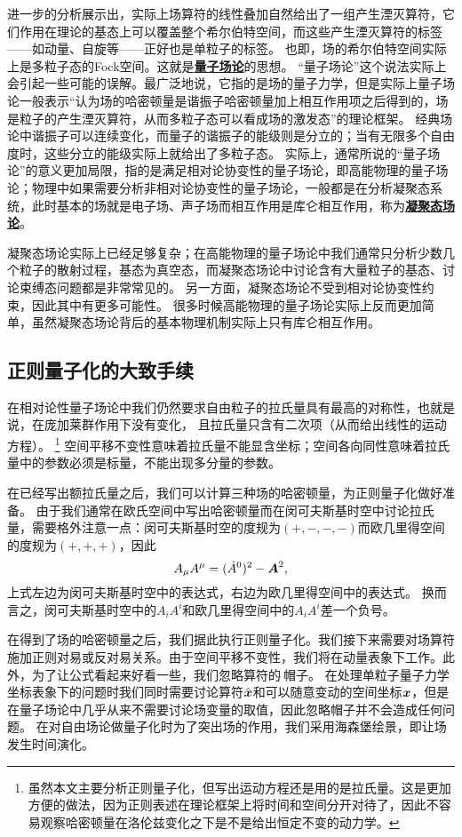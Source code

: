 \documentclass[hyperref, UTF8, a4paper]{ctexart}
\newcommand{\concept}[1]{\underline{\textbf{#1}}}
\begin{document}
进一步的分析展示出，实际上场算符的线性叠加自然给出了一组产生湮灭算符，它们作用在理论的基态上可以覆盖整个希尔伯特空间，而这些产生湮灭算符的标签——如动量、自旋等——正好也是单粒子的标签。
也即，场的希尔伯特空间实际上是多粒子态的Fock空间。这就是\concept{量子场论}的思想。
“量子场论”这个说法实际上会引起一些可能的误解。最广泛地说，它指的是场的量子力学，但是实际上量子场论一般表示“认为场的哈密顿量是谐振子哈密顿量加上相互作用项之后得到的，场是粒子的产生湮灭算符，从而多粒子态可以看成场的激发态”的理论框架。
经典场论中谐振子可以连续变化，而量子的谐振子的能级则是分立的；当有无限多个自由度时，这些分立的能级实际上就给出了多粒子态。
实际上，通常所说的“量子场论”的意义更加局限，指的是满足相对论协变性的量子场论，即高能物理的量子场论；物理中如果需要分析非相对论协变性的量子场论，一般都是在分析凝聚态系统，此时基本的场就是电子场、声子场而相互作用是库仑相互作用，称为\concept{凝聚态场论}。

凝聚态场论实际上已经足够复杂；在高能物理的量子场论中我们通常只分析少数几个粒子的散射过程，基态为真空态，而凝聚态场论中讨论含有大量粒子的基态、讨论束缚态问题都是非常常见的。
另一方面，凝聚态场论不受到相对论协变性约束，因此其中有更多可能性。
很多时候高能物理的量子场论实际上反而更加简单，虽然凝聚态场论背后的基本物理机制实际上只有库仑相互作用。

\subsection{正则量子化的大致手续}\label{sec:canonical-general}

在相对论性量子场论中我们仍然要求自由粒子的拉氏量具有最高的对称性，也就是说，在庞加莱群作用下没有变化，
且拉氏量只含有二次项（从而给出线性的运动方程）。%
\footnote{虽然本文主要分析正则量子化，但写出运动方程还是用的是拉氏量。这是更加方便的做法，因为正则表述在理论框架上将时间和空间分开对待了，因此不容易观察哈密顿量在洛伦兹变化之下是不是给出恒定不变的动力学。}
空间平移不变性意味着拉氏量不能显含坐标；空间各向同性意味着拉氏量中的参数必须是标量，不能出现多分量的参数。

在已经写出额拉氏量之后，我们可以计算三种场的哈密顿量，为正则量子化做好准备。
由于我们通常在欧氏空间中写出哈密顿量而在闵可夫斯基时空中讨论拉氏量，需要格外注意一点：闵可夫斯基时空的度规为$(+, -, -, -)$而欧几里得空间的度规为$(+, +, +)$，因此
\[
    A_\mu A^\mu = (\dot{A}^0)^2 - \vb*{A}^2,
\]
上式左边为闵可夫斯基时空中的表达式，右边为欧几里得空间中的表达式。
换而言之，闵可夫斯基时空中的$A_i A^i$和欧几里得空间中的$A_i A^i$差一个负号。

在得到了场的哈密顿量之后，我们据此执行正则量子化。我们接下来需要对场算符施加正则对易或反对易关系。由于空间平移不变性，我们将在动量表象下工作。此外，为了让公式看起来好看一些，我们忽略算符的$\hat{\ }$帽子。
在处理单粒子量子力学坐标表象下的问题时我们同时需要讨论算符$\hat{\vb*{x}}$和可以随意变动的空间坐标$\vb*{x}$，但是在量子场论中几乎从来不需要讨论场变量的取值，因此忽略帽子并不会造成任何问题。
在对自由场论做量子化时为了突出场的作用，我们采用海森堡绘景，即让场发生时间演化。
\end{document}
